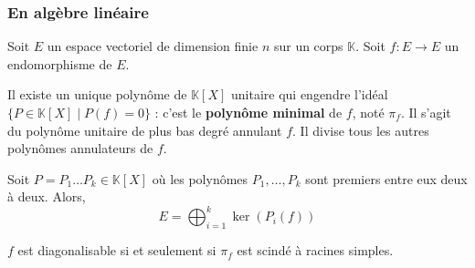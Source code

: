 	\subsubsection{En algèbre linéaire}

	Soit $E$ un espace vectoriel de dimension finie $n$ sur un corps $\mathbb{K}$. Soit $f : E \rightarrow E$ un endomorphisme de $E$.


	\begin{application}
		Il existe un unique polynôme de $\mathbb{K}[X]$ unitaire qui engendre l'idéal $\{ P \in \mathbb{K}[X] \mid P(f) = 0 \}$ : c'est le \textbf{polynôme minimal} de $f$, noté $\pi_f$. Il s'agit du polynôme unitaire de plus bas degré annulant $f$. Il divise tous les autres polynômes annulateurs de $f$.
	\end{application}


	\begin{theorem}
		Soit $P = P_1 \dots P_k \in \mathbb{K}[X]$ où les polynômes $P_1, \dots, P_k$ sont premiers entre eux deux à deux. Alors,
		\[ E = \bigoplus_{i=1}^k \ker(P_i(f)) \]
	\end{theorem}

	\begin{application}
		$f$ est diagonalisable si et seulement si $\pi_f$ est scindé à racines simples.
	\end{application}

